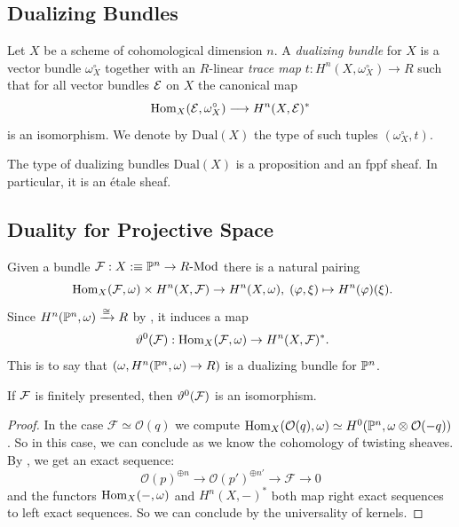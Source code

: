 \subsection{Dualizing Bundles}


\begin{definition}
  Let $X$ be a scheme of cohomological dimension $n$.
  A \emph{dualizing bundle} for $X$ is a vector bundle $\omega^\circ_X$ together with an $R$-linear \emph{trace map} $t : H^n(X, \omega_X^\circ) \to R$ such that for all vector bundles $\mathcal{E}$ on $X$ the canonical map
  \[
    \mathrm{Hom}_X(\mathcal{E}, \omega_X^\circ) \longrightarrow H^n(X,\mathcal{E})^\ast
  \]
  is an isomorphism.
  We denote by $\mathrm{Dual}(X)$ the type of such tuples $(\omega_X^\circ,t)$.
\end{definition}

\begin{lemma}
  The type of dualizing bundles $\mathrm{Dual}(X)$ is a proposition and an fppf sheaf.
  In particular, it is an étale sheaf.
\end{lemma}




\subsection{Duality for Projective Space}

Given a bundle $\mathcal{F} : X:\equiv\mathbb{P}^n \to R\text{-}\mathrm{Mod}$ there is a natural pairing
\[
  \Hom_X(\mc F,\omega) \times H^n(X,\mc F) \to H^n(X,\omega), \;
  (\varphi,\xi) \mapsto H^n(\varphi)(\xi)
  \rlap{.}
\]
Since $H^n(\mathbb{P}^n,\omega) \xrightarrow{\cong} R$ by , it induces a map
\[
  \vartheta^0(\mc F) : \Hom_X(\mc F,\omega) \to H^n(X,\mc F)^\ast \rlap{.}
\]
This is to say that $(\omega, H^n(\mathbb{P}^n,\omega) \to R)$ is a dualizing bundle for $\mathbb{P}^n$.

\begin{lemma}
  If $\mathcal{F}$ is finitely presented, then $\vartheta^0(\mathcal{F})$ is an isomorphism.
\end{lemma}

\begin{proof}
  In the case $\mathcal F\simeq \mathcal O(q)$ we compute $\mathrm{Hom}_X(\mathcal O(q),\omega)\simeq H^0(\mathbb{P}^n,\omega\otimes \mathcal O(-q))$.
  So in this case, we can conclude as we know the cohomology of twisting sheaves.
  By , we get an exact sequence:
  \[ \mathcal O(p)^{\oplus n}\to\mathcal O(p')^{\oplus n'}\to \mathcal F\to 0 \]
  and the functors $\mathrm{Hom}_X(-,\omega)$ and $H^n(X,-)^\ast$ both map right exact sequences to left exact sequences. So we can conclude by the universality of kernels.
\end{proof}


